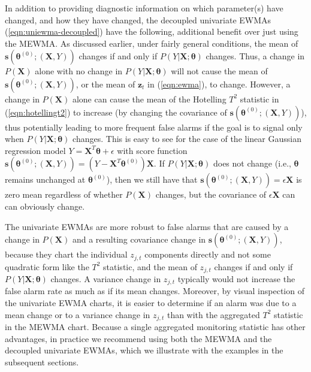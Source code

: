 \documentclass[twoside,11pt]{article}
\begin{document}
In addition to providing diagnostic information on which parameter(s) have changed, and how they have changed, the decoupled univariate EWMAs (\ref{eqn:uniewma-decoupled}) have the following, additional benefit over just using the MEWMA. As discussed earlier, under fairly general conditions, the mean of $\bm{s}(\bm { \theta}^{ (0)}; (\bm {X}, Y))$ changes if and only if $P(Y|\bm{X};\bm{\theta})$ changes. Thus, a change in $P(\bm{X})$ alone with no change in $P(Y|\bm{X};\bm{\theta})$ will not cause the mean of $\bm{s}(\bm { \theta}^{ (0)}; (\bm {X}, Y))$, or the mean of $\bm{z}_t$ in (\ref{eqn:ewma}), to change. However, a change in $P(\bm{X})$ alone can cause the mean of the Hotelling $T^2$ statistic in (\ref{eqn:hotellingt2}) to increase (by changing the covariance of $\bm{s}(\bm { \theta}^{ (0)}; (\bm {X}, Y))$), thus potentially leading to more frequent false alarms if the goal is to signal only when $P(Y|\bm{X};\bm{\theta})$ changes. This is easy to see for the case of the linear Gaussian regression model $Y = \bm{X}^T\bm{\theta} + \epsilon$ with score function $\bm{s}(\bm { \theta}^{ (0)}; (\bm {X}, Y)) = (Y - \bm{X}^T\bm{\theta}^{ (0)})\bm{X}$. If $P(Y|\bm{X};\bm{\theta})$ does not change (i.e., $\bm{\theta}$ remains unchanged at $\bm{\theta}^{ (0)}$), then we still have that $\bm{s}(\bm { \theta}^{ (0)}; (\bm {X}, Y)) = \epsilon \bm{X}$ is zero mean regardless of whether $P(\bm{X})$ changes, but the covariance of $\epsilon \bm{X}$ can can obviously change.   

The univariate EWMAs are more robust to false alarms that are caused by a change in $P(\bm{X})$ and a resulting covariance change in $\bm{s}(\bm { \theta}^{ (0)}; (\bm {X}, Y))$, because they chart the individual $z_{j,t}$ components directly and not some quadratic form like the $T^2$ statistic, and the mean of $z_{j,t}$ changes if and only if $P(Y|\bm{X};\bm{\theta})$ changes. A variance change in $z_{j,t}$ typically would not increase the false alarm rate as much as if its mean changes. Moreover, by visual inspection of the univariate EWMA charts, it is easier to determine if an alarm was due to a mean change or to a variance change in $z_{j,t}$ than with the aggregated $T^2$ statistic in the MEWMA chart.  Because a single aggregated monitoring statistic has other advantages, in practice we recommend using both the MEWMA and the decoupled univariate EWMAs, which we illustrate with the examples in the subsequent sections. 
\end{document}
